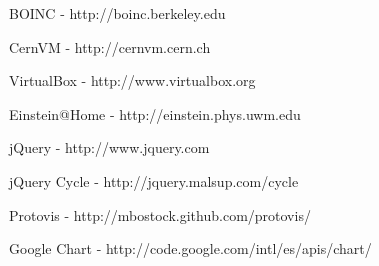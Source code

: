 \documentclass[twocolumn,aps]{revtex4}
\makeatletter
\newcommand{\cernvm}{CernVM}
\newcommand{\boinc}{BOINC}
\newcommand{\virtualbox}{VirtualBox}
\newcommand{\einsteinathome}{Einstein@Home}
\newcommand{\jquery}{jQuery}
\newcommand{\protovis}{Protovis}
\newcommand{\googlechart}{Google Chart}
\makeatother
\begin{document}
  \begin{thebibliography}{9}

      \boinc{} - http://boinc.berkeley.edu

      \cernvm{} - http://cernvm.cern.ch

      \virtualbox{} - http://www.virtualbox.org

      \einsteinathome{} - http://einstein.phys.uwm.edu

      \jquery{} - http://www.jquery.com

      \jquery{} Cycle - http://jquery.malsup.com/cycle
     
      \protovis{} - http://mbostock.github.com/protovis/

      \googlechart{} - http://code.google.com/intl/es/apis/chart/

  \end{thebibliography}
\end{document}

